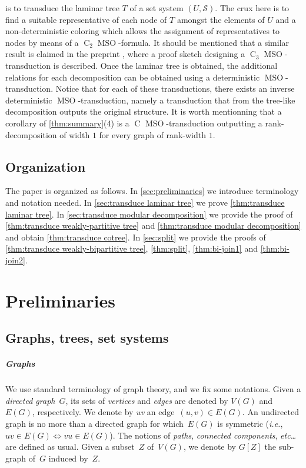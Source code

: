 \documentclass{lmcs} %
\newcommand*\defd[2][\em\color{red!25!black}]{{#1#2}}
\newcommand{\MSO}{\ensuremath{\operatorname{MSO}}\xspace}
\newcommand{\CMSO}[1][]{\ensuremath{\C[#1]{\!\!}\MSO}\xspace}
\newcommand{\C}[1][]{\ensuremath{\operatorname{C}_{#1}}\xspace}
\newcommand{\etc}{\emph{etc\ldots}\xspace}
\def\ie{{\em i.e.}}
\begin{document}
is to transduce the laminar tree $T$ of a set system $(U,\mathcal{S})$.
The crux here is to find a suitable representative of each node of $T$ amongst the elements of $U$
and a non-deterministic coloring which allows the assignment of representatives to nodes by means of a \CMSO[2]-formula.
It should be mentioned that a similar result is claimed in the preprint \cite{Boj23},
where a proof sketch designing a \CMSO[3]-transduction is described.
%
Once the laminar tree is obtained,
the additional relations for each decomposition
can be obtained using a deterministic \MSO-transduction.
Notice that for each of these transductions,
there exists an inverse deterministic \MSO-transduction,
namely a transduction that from the tree-like decomposition outputs the original structure. It is worth mentionning that a corollary of
\autoref{thm:summary}(4) is a \CMSO-transduction outputting a rank-decomposition of width $1$ for every graph of rank-width $1$. 


\begin{figure}[omitted: a diagram of this paper's results, not reproduced here]\label{fig:overview}\end{figure}
\bigbreak

\subsection{Organization}
The paper is organized as follows. In \autoref{sec:preliminaries} we introduce terminology and notation needed. In \autoref{sec:transduce laminar tree} we prove \autoref{thm:transduce laminar tree}. In \autoref{sec:transduce modular decomposition} we provide the proof of \autoref{thm:transduce weakly-partitive tree} and \autoref{thm:transduce modular decomposition} and obtain \autoref{thm:transduce cotree}. In \autoref{sec:split} we provide the proofs of \autoref{thm:transduce weakly-bipartitive tree}, \autoref{thm:split}, \autoref{thm:bi-join1} and \autoref{thm:bi-join2}.

\section{Preliminaries}\label{sec:preliminaries}
\subsection{Graphs, trees, set systems}
\subparagraph{Graphs}
We use standard terminology of graph theory,
and we fix some notations.
Given a \emph{directed graph}~$G$,
its sets of \emph{vertices} and \emph{edges}
are denoted by \defd{$V(G)$} and \defd{$E(G)$}, respectively.
We denote by \defd{uv} an edge~$(u,v)\in E(G)$.
An undirected graph is no more than a directed graph
for which~$E(G)$ is symmetric (\ie, $uv\in E(G)\iff vu\in E(G)$).
The notions of \emph{paths}, \emph{connected components}, \etc are defined as usual.
Given a subset~$Z$ of~$V(G)$,
we denote by \defd{$G[Z]$} the sub-graph of~$G$ induced by~$Z$.
\end{document}
